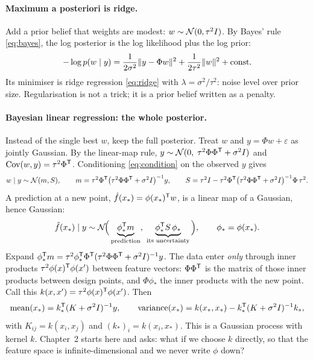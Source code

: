 \paragraph{Maximum a posteriori is ridge.} Add a prior belief that weights are modest: $w \sim \mathcal{N}(0, \tau^2 I)$.
By Bayes' rule \eqref{eq:bayes}, the log posterior is the log likelihood plus the log prior:
\begin{equation}
  -\log p(w \mid y) = \frac{1}{2\sigma^2}\lVert y - \Phi w\rVert^2 + \frac{1}{2\tau^2}\lVert w\rVert^2 + \text{const}.
\end{equation}
Its minimiser is ridge regression \eqref{eq:ridge} with $\lambda = \sigma^2/\tau^2$: noise level over prior size.
Regularisation is not a trick; it is a prior belief written as a penalty.

\paragraph{Bayesian linear regression: the whole posterior.} Instead of the single best $w$, keep the full posterior.
Treat $w$ and $y = \Phi w + \varepsilon$ as jointly Gaussian. By the linear-map rule, $y \sim \mathcal{N}(0,\; \tau^2\Phi\Phi^{\mathsf{T}}
+ \sigma^2 I)$ and $\operatorname{Cov}(w, y) = \tau^2\Phi^{\mathsf{T}}$. Conditioning \eqref{eq:condition} on the observed $y$ gives
\begin{equation}
  w \mid y \sim \mathcal{N}(m, S), \qquad
  m = \tau^2 \Phi^{\mathsf{T}}\big(\tau^2 \Phi\Phi^{\mathsf{T}} + \sigma^2 I\big)^{-1} y, \qquad
  S = \tau^2 I - \tau^2\Phi^{\mathsf{T}}\big(\tau^2\Phi\Phi^{\mathsf{T}} + \sigma^2 I\big)^{-1}\Phi\,\tau^2 .
  \label{eq:blr}
\end{equation}
A prediction at a new point, $\hat f(x_*) = \phi(x_*)^{\mathsf{T}} w$, is a linear map of a Gaussian, hence Gaussian:
\begin{equation}
  \hat f(x_*) \mid y \sim \mathcal{N}\!\Big(\underbrace{\phi_*^{\mathsf{T}} m}_{\text{prediction}},\;
                                   \underbrace{\phi_*^{\mathsf{T}} S\, \phi_*}_{\text{its uncertainty}}\Big),
  \qquad \phi_* = \phi(x_*).
  \label{eq:blr_pred}
\end{equation}
Expand $\phi_*^{\mathsf{T}} m = \tau^2\phi_*^{\mathsf{T}}\Phi^{\mathsf{T}}(\tau^2\Phi\Phi^{\mathsf{T}} + \sigma^2 I)^{-1} y$. The data enter \emph{only} through
inner products $\tau^2\phi(x)^{\mathsf{T}}\phi(x')$ between feature vectors: $\Phi\Phi^{\mathsf{T}}$ is the matrix of those inner products
between design points, and $\Phi\phi_*$ the inner products with the new point. Call this
$k(x, x') = \tau^2\phi(x)^{\mathsf{T}}\phi(x')$. Then
\begin{equation}
  \text{mean}(x_*) = k_*^{\mathsf{T}} (K + \sigma^2 I)^{-1} y, \qquad
  \text{variance}(x_*) = k(x_*,x_*) - k_*^{\mathsf{T}} (K + \sigma^2 I)^{-1} k_*,
  \label{eq:gp_preview}
\end{equation}
with $K_{ij} = k(x_i, x_j)$ and $(k_*)_i = k(x_i, x_*)$. This is a Gaussian process with kernel $k$. Chapter~2
starts here and asks: what if we choose $k$ directly, so that the feature space is infinite-dimensional and we never
write $\phi$ down?

